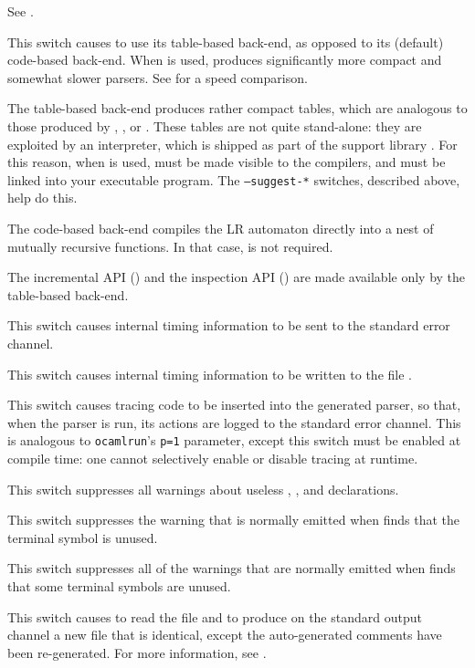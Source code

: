 \documentclass[onecolumn,11pt,nocopyrightspace,preprint]{sigplanconf}
\begin{document}
 See .

\docswitch{\otable} This switch causes \menhir to use its table-based
back-end, as opposed to its (default) code-based back-end. When \otable is
used, \menhir produces significantly more compact and somewhat slower parsers.
See  for a speed comparison.

The table-based back-end produces rather compact tables, which are analogous
to those produced by \yacc, \bison, or \ocamlyacc. These tables are not quite
stand-alone: they are exploited by an interpreter, which is shipped as part of
the support library \menhirlib. For this reason, when \otable is used,
\menhirlib must be made visible to the \ocaml compilers, and must be linked
into your executable program. The \texttt{--suggest-*} switches, described
above, help do this.

The code-based back-end compiles the LR automaton directly into a nest of
mutually recursive \ocaml functions. In that case, \menhirlib is not required.

The incremental API () and the inspection API
() are made available only by the table-based back-end.

\docswitch{\otimings} This switch causes internal timing information to
be sent to the standard error channel.

 This switch causes internal timing
information to be written to the file .

\docswitch{\otrace} This switch causes tracing code to be inserted into
the generated parser, so that, when the parser is run, its actions are
logged to the standard error channel. This is analogous to \texttt{ocamlrun}'s
\texttt{p=1} parameter, except this switch must be enabled at compile time:
one cannot selectively enable or disable tracing at runtime.

\docswitch{\oignoreprec} This switch suppresses all warnings about
useless \dleft, \dright, \dnonassoc and \dprec declarations.

 This switch suppresses the warning that
is normally emitted when \menhir finds that the terminal symbol  is
unused.

\docswitch{\oignoreall} This switch suppresses all of the warnings that are
normally emitted when \menhir finds that some terminal symbols are unused.

 This switch causes \menhir to
read the \messages file  and to produce on the standard output
channel a new \messages file that is identical, except the auto-generated
comments have been re-generated. For more information,
see .
\end{document}
